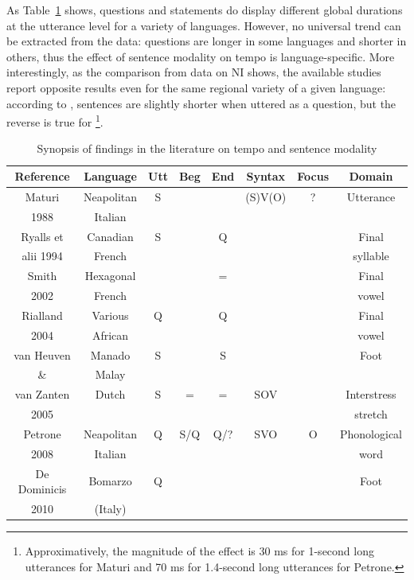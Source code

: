 As Table~\ref{tab41} shows, questions and statements do display different global durations at the utterance level for a variety of languages. However, no universal trend can be extracted from the data: questions are longer in some languages and shorter in others, thus the effect of sentence modality on tempo is language-specific. More interestingly, as the comparison from data on NI shows, the available studies report opposite results even for the same regional variety of a given language: according to \citet[table 6]{maturi1988intonazione}, sentences are slightly shorter when uttered as a question, but the reverse is true for \citet[p. 163]{petrone2008role}\footnote{Approximatively, the magnitude of the effect is 30 ms for 1-second long utterances for Maturi and 70 ms for 1.4-second long utterances for Petrone.}. 

\begin{landscape}
\begin{table}[p]
\centering
\begin{tabular}{c c c c c c c c}
Reference & Language & Utt & Beg & End & Syntax & Focus & Domain \\
\hline\hline
Maturi & Neapolitan & S & & & (S)V(O) & ? & Utterance\\
1988 & Italian & & & & & & \\
\hline
Ryalls et & Canadian & S & & Q & & & Final \\
alii 1994 & French & & & & & & syllable \\
\hline
Smith & Hexagonal & & & = & & & Final \\
2002 & French & & & & & & vowel \\
\hline
Rialland & Various & Q & & Q & & & Final \\
2004 & African & & & & & & vowel \\
\hline
van Heuven & Manado & S & & S & & & Foot \\
\& & Malay & & & & & & \\
van Zanten & Dutch & S & = & = & SOV & & Interstress \\
2005 & & & & & & & stretch \\
\hline
Petrone & Neapolitan & Q & S/Q & Q/? & SVO & O & Phonological \\
2008 & Italian & & & & & & word \\
\hline
De Dominicis & Bomarzo & Q & & & & & Foot \\
2010 & (Italy) & & & & & & \\
\end{tabular}
\caption{Synopsis of findings in the literature on tempo and sentence modality}
\label{tab41}\end{table}
\end{landscape}

